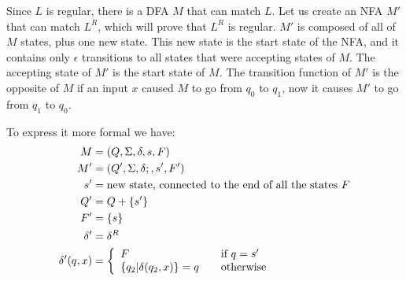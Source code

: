 

Since $L$ is regular, there is a DFA $M$ that can match $L$. Let us create an NFA $M'$ that can match $L^R$, which will prove that $L^R$ is regular.
$M'$ is composed of all of $M$ states, plus one new state. This new state is the start state of the NFA, and it contains only $\epsilon$ transitions to all states that were accepting states of $M$. The accepting state of $M'$ is the start state of $M$. The transition function of $M'$ is the opposite of $M$ if an input $x$ caused $M$ to go from $q_0$ to $q_1$, now it causes $M'$ to go from $q_1$ to $q_0$.

To express it more formal we have:
\begin{align*}
M &= (Q, \Sigma, \delta, s, F) \\
M' &= (Q', \Sigma, \delta;, s', F') \\
s' &= \text{new state, connected to the end of all the states }F \\
Q' &= Q + \{ s' \} \\
F' &= \{ s \} \\
\delta' &= \delta^R \\
\delta'(q,x) &= \left\{ 
  \begin{array}{l l}
    F & \quad \text{if } q = s' \\
    \{q_2 | \delta(q_2,x)\} = q & \quad \text{otherwise}
  \end{array} \right.
\end{align*}

